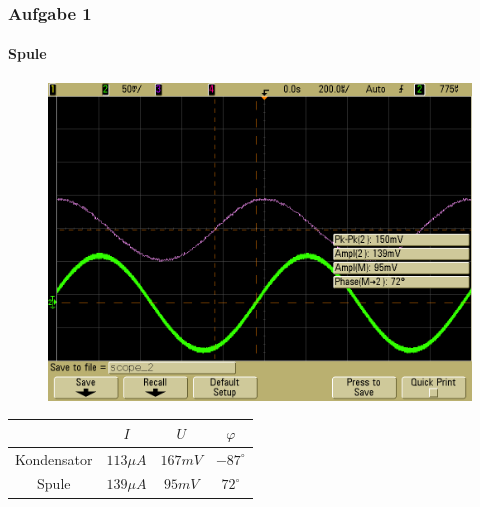 \begin{frame}
\frametitle{Aufgabe 1}
\framesubtitle{Spule}
\begin{figure}[H]
    \begin{center}
                \includegraphics[scale=0.15]{./img/1b_Spule.png}
    \end{center}
\end{figure}
\begin{center}
\begin{tabular}{c|| c | c | c}
    & $I$ & $U$ & $\varphi$ \\
    \hline
    Kondensator & $113 \mu A$ & $167mV$ & $-87^{\circ}$ \\
    Spule & $139 \mu A$ & $95 mV$ & $72^{\circ}$ 
\end{tabular}
\end{center}
\end{frame}

